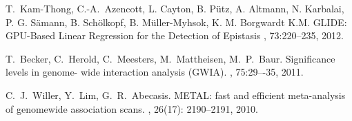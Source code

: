 \documentclass{article}
\begin{document}
\begin{thebibliography}{2}
         T.~Kam-Thong, C.-A.~Azencott, L. Cayton,
    B. Pütz, A. Altmann, N. Karbalai, P. G. Sämann, B. Schölkopf,
    B. Müller-Myhsok, K. M. Borgwardt K.M.  \newblock GLIDE: GPU-Based
    Linear Regression for the Detection of Epistasis , 73:220--235, 2012.

         T.~Becker, C.~Herold, C.~Meesters,
    M.~Mattheisen, M.~P.~Baur.  \newblock Significance levels in
    genome- wide interaction analysis (GWIA).  , 75:29–-35, 2011.

     C.~J.~Willer, Y.~Lim, G.~R.~Abecasis. \newblock
METAL: fast and efficient meta-analysis of genomewide association
scans. , 26(17): 2190–2191, 2010.
\end{thebibliography}
\end{document}
